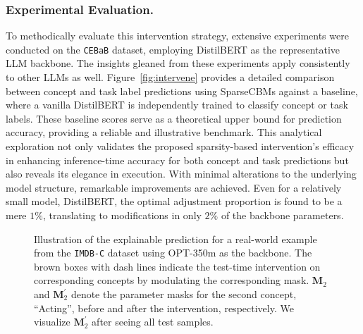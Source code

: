 \documentclass[letterpaper]{article} %
\begin{document}
\subsubsection{Experimental Evaluation.}
To methodically evaluate this intervention strategy, extensive experiments were conducted on the \texttt{CEBaB} dataset, employing DistilBERT as the representative LLM backbone. The insights gleaned from these experiments apply consistently to other LLMs as well. Figure~\ref{fig:intervene} provides a detailed comparison between concept and task label predictions using SparseCBMs against a baseline, where a vanilla DistilBERT is independently trained to classify concept or task labels. These baseline scores serve as a theoretical upper bound for prediction accuracy, providing a reliable and illustrative benchmark.
This analytical exploration not only validates the proposed sparsity-based intervention's efficacy in enhancing inference-time accuracy for both concept and task predictions but also reveals its elegance in execution. With minimal alterations to the underlying model structure, remarkable improvements are achieved. Even for a relatively small model, DistilBERT, the optimal adjustment proportion is found to be a mere $1\%$, translating to modifications in only $2\%$ of the backbone parameters.

\begin{figure}[t]
  \centering
  \caption{Illustration of the explainable prediction for a real-world example from the \texttt{IMDB-C} dataset using OPT-350m as the backbone. The brown boxes with dash lines indicate the test-time intervention on corresponding concepts by modulating the corresponding mask. $\bm{M}_2$ and $\bm{M}_2^\prime$ denote the parameter masks for the second concept, ``Acting'', before and after the intervention, respectively. We visualize $\bm{M}_2^\prime$ after seeing all test samples.}
  \label{fig:inter}
\end{figure}
\end{document}
